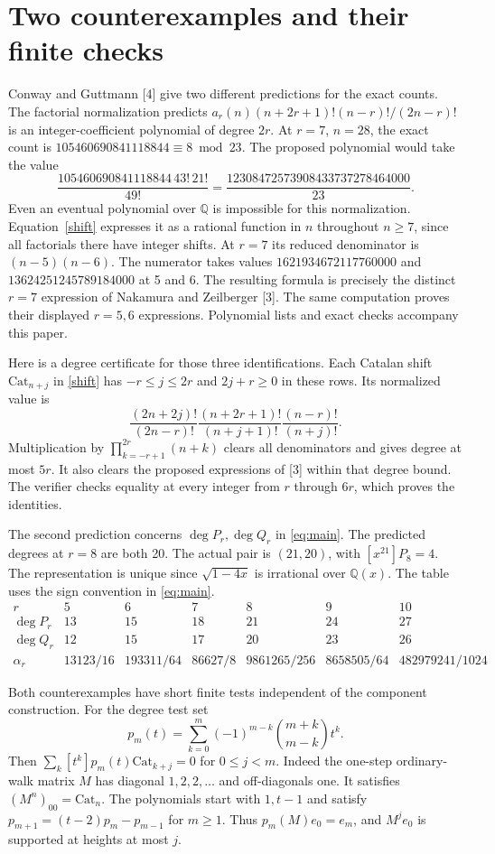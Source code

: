 \documentclass[11pt,letterpaper]{article}
\newcommand{\Cat}{\mathrm{Cat}}
\begin{document}
\section{Two counterexamples and their finite checks}
Conway and Guttmann [4] give two different predictions for the exact counts. The factorial normalization predicts $a_r(n)(n+2r+1)!(n-r)!/(2n-r)!$ is an integer-coefficient polynomial of degree $2r$. At $r=7$, $n=28$, the exact count is $105460690841118844\equiv8\bmod23$. The proposed polynomial would take the value
\[
 \frac{105460690841118844\,43!\,21!}{49!}
 =\frac{12308472573908433737278464000}{23}.
\]
Even an eventual polynomial over $\mathbb Q$ is impossible for this normalization. Equation~\eqref{shift} expresses it as a rational function in $n$ throughout $n\ge7$, since all factorials there have integer shifts. At $r=7$ its reduced denominator is $(n-5)(n-6)$. The numerator takes values $1621934672117760000$ and $13624251245789184000$ at 5 and 6. The resulting formula is precisely the distinct $r=7$ expression of Nakamura and Zeilberger [3]. The same computation proves their displayed $r=5,6$ expressions. Polynomial lists and exact checks accompany this paper.

Here is a degree certificate for those three identifications. Each Catalan shift $\Cat_{n+j}$ in \eqref{shift} has $-r\le j\le 2r$ and $2j+r\ge0$ in these rows. Its normalized value is
\[
 \frac{(2n+2j)!}{(2n-r)!}
 \frac{(n+2r+1)!}{(n+j+1)!}
 \frac{(n-r)!}{(n+j)!}.
\]
Multiplication by $\prod_{k=-r+1}^{2r}(n+k)$ clears all denominators and gives degree at most $5r$. It also clears the proposed expressions of [3] within that degree bound. The verifier checks equality at every integer from $r$ through $6r$, which proves the identities.

The second prediction concerns $\deg P_r,\deg Q_r$ in \eqref{eq:main}. The predicted degrees at $r=8$ are both 20. The actual pair is $(21,20)$, with $[x^{21}]P_8=4$. The representation is unique since $\sqrt{1-4x}$ is irrational over $\mathbb Q(x)$. The table uses the sign convention in \eqref{eq:main}.
\[
\begin{array}{c|rrrrrr}
 r & 5 & 6 & 7 & 8 & 9 & 10\\ \hline
 \deg P_r &13&15&18&21&24&27\\
 \deg Q_r &12&15&17&20&23&26\\
 \alpha_r&13123/16&193311/64&86627/8&9861265/256&8658505/64&482979241/1024
\end{array}
\]

Both counterexamples have short finite tests independent of the component construction. For the degree test set
\[
 p_m(t)=\sum_{k=0}^m(-1)^{m-k}\binom{m+k}{m-k}t^k .
\]
Then $\sum_k[t^k]p_m(t)\Cat_{k+j}=0$ for $0\le j<m$. Indeed the one-step ordinary-walk matrix $M$ has diagonal $1,2,2,\ldots$ and off-diagonals one. It satisfies $(M^n)_{00}=\Cat_n$. The polynomials start with $1,t-1$ and satisfy $p_{m+1}=(t-2)p_m-p_{m-1}$ for $m\ge1$. Thus $p_m(M)e_0=e_m$, and $M^je_0$ is supported at heights at most $j$.
\end{document}
